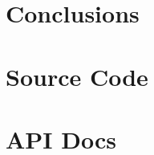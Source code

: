 \chapter{Conclusions} \label{chapter:Conclusions} \label{\chaptername::\thechapter}


\setcounter{mychaptercountr}{\value{chapter}}

\renewcommand{\chaptername}{Appendix}
\renewcommand{\thechapter}{A}
\chapter{Source Code} \label{appendix:SourceCode} \label{\chaptername::\thechapter}

\addtocounter{chapter}{+1}
\addtocounter{mychaptercountr}{+1}

\renewcommand{\thechapter}{B}
\chapter{API Docs} \label{appendix:APIDocs} \label{\chaptername::\thechapter}

\addtocounter{chapter}{+1}
\addtocounter{mychaptercountr}{+1}

\renewcommand{\chaptername}{Chapter}
\renewcommand{\thechapter}{\arabic{chapter}}
\setcounter{section}{0}

\cleardoublepage {}
\pagestyle{empty}
